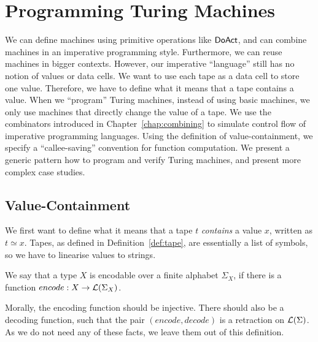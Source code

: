 \chapter{Programming Turing Machines}
\label{chap:programming}

We can define machines using primitive operations like $\mathsf{DoAct}$, and can combine machines in an imperative programming style.  Furthermore, we can
reuse machines in bigger contexts.  However, our imperative ``language'' still has no notion of values or data cells.  We want to use each tape as a
data cell to store one value.  Therefore, we have to define what it means that a tape contains a value.  When we ``program'' Turing machines, instead
of using basic machines, we only use machines that directly change the value of a tape.  We use the combinators introduced in
Chapter~\ref{chap:combining} to simulate control flow of imperative programming languages.  Using the definition of value-containment, we specify a
``callee-saving'' convention for function computation.  We present a generic pattern how to program and verify Turing machines, and present more
complex case studies.


\section{Value-Containment}
\label{sec:value-containment}

We first want to define what it means that a tape $t$ \emph{contains} a value $x$, written as $t \simeq x$.  Tapes, as defined in
Definition~\ref{def:tape}, are essentially a list of symbols, so we have to linearise values to strings.

%
\begin{definition}
  \label{def:encodable}
  We say that a type $X$ is encodable over a finite alphabet $\Sigma_X$, if there is a function $encode : X \rightarrow \mathcal{L}(\Sigma_X)$.
\end{definition}

Morally, the encoding function should be injective.  There should also be a decoding function, such that the pair $(encode, decode)$ is a retraction
on $\mathcal{L}(\Sigma)$.  As we do not need any of these facts, we leave them out of this definition.

